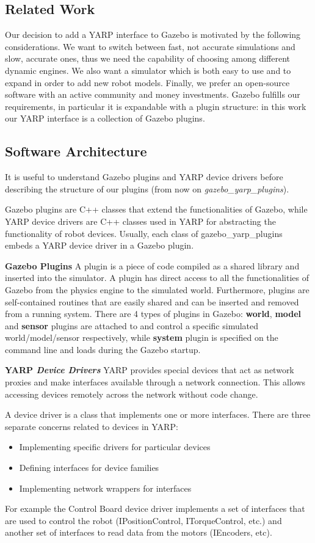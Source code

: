 \subsection{Related Work}\label{state_of_art4}
Our decision to add a YARP interface to Gazebo is motivated by the following considerations.
We want to switch between fast, not accurate simulations and slow, accurate ones, thus we need the capability of choosing among different dynamic engines. We also want a simulator which is both easy to use and to expand in order to add new robot models. Finally, we prefer an open-source software with an active community and money investments.
Gazebo fulfills our requirements, in particular it is expandable with a plugin structure: in this work our YARP interface is a collection of Gazebo plugins. 




\subsection{Software Architecture}\label{structure}
It is useful to understand Gazebo plugins and YARP device drivers before describing the structure of our plugins (from now on \emph{gazebo\_yarp\_plugins}).

Gazebo plugins are C++ classes that extend the functionalities of Gazebo, while YARP device drivers are C++ classes used in YARP for abstracting the functionality of robot devices.
Usually, each class of gazebo\_yarp\_plugins embeds a YARP device driver in a Gazebo plugin. 

{\bf Gazebo Plugins}
A plugin is a piece of code compiled as a shared library and inserted into the simulator. A plugin has direct access to all the functionalities of Gazebo from the physics engine to the simulated world. Furthermore, plugins are self-contained routines that are easily shared and can be inserted and removed from a running system. There are 4 types of plugins in Gazebo: \textbf{world}, \textbf{model} and \textbf{sensor} plugins are attached to and control a specific simulated world/model/sensor respectively, while \textbf{system} plugin is specified on the command line and loads during the Gazebo startup.


{\bf YARP \emph{Device Drivers}}
YARP provides special devices that act as network proxies and make interfaces available through a network connection. This allows accessing devices remotely across the network without code change.

A device driver is a class that implements one or more interfaces. There are three separate concerns related to devices in YARP:
\begin{itemize}
\item Implementing specific drivers for particular devices
\item Defining interfaces for device families
\item Implementing network wrappers for interfaces
\end{itemize}
For example the Control Board device driver implements a set of interfaces that are used to control the robot (IPositionControl, ITorqueControl, etc.) and another set of interfaces to read data from the motors (IEncoders, etc).

